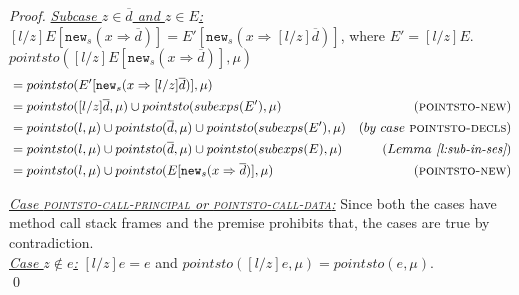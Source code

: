 \documentclass{llncs}
\newcommand{\keywadj}[1]{\mathtt{#1}}
\begin{document}
\begin{proof}
\noindent\underline{\textit{Subcase $z \in \overline{d}$ and $z \in E$:}} $[l / z]E[\keywadj{new}_s(x \Rightarrow \overline{d})] = E'[\keywadj{new}_s(x \Rightarrow [l / z]\overline{d})]$, where $E' = [l / z]E$.\\
$pointsto([l / z]E[\keywadj{new}_s(x \Rightarrow \overline{d})], \mu)$
\vspace{-7pt}
\begin{align*}
&= pointsto(E'[\keywadj{new}_s(x \Rightarrow [l / z]\overline{d})], \mu)\\
&= pointsto([l / z]\overline{d}, \mu) \cup pointsto(subexps(E'), \mu) & (\textsc{pointsto-new})\\
&= pointsto(l, \mu) \cup pointsto(\overline{d}, \mu) \cup pointsto(subexps(E'), \mu) & (by~case~\textsc{pointsto-decls})\\
&= pointsto(l, \mu) \cup pointsto(\overline{d}, \mu) \cup pointsto(subexps(E), \mu) & (Lemma~\textit{\ref{l:sub-in-ses}})\\
&= pointsto(l, \mu) \cup pointsto(E[\keywadj{new}_s(x \Rightarrow \overline{d})], \mu) & (\textsc{pointsto-new})
\end{align*}

\noindent\underline{\textit{Case \textsc{pointsto-call-principal} or \textsc{pointsto-call-data}:}} Since both the cases have method call stack frames and the premise prohibits that, the cases are true by contradiction.\\

\noindent\underline{\underline{\textit{Case $z \not\in e$:}}} $[l / z]e = e$ and $pointsto([l / z]e, \mu) = pointsto(e, \mu)$.\\
\qed
\end{proof}



\newpage
\end{document}
